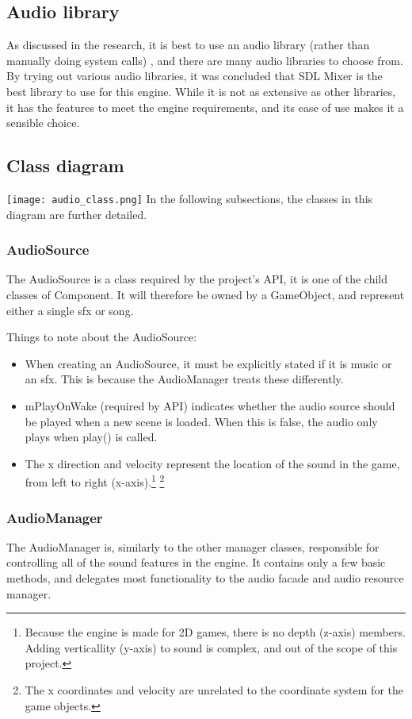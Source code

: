 \documentclass{article}
\begin{document}
\subsection{Audio library}
As discussed in the research, it is best to use an audio library (rather than manually doing system calls)
, and there are many audio libraries to choose from. By trying out various audio libraries, it was concluded that
SDL Mixer is the best library to use for this engine. While it is not as extensive as other libraries,
it has the features to meet the engine requirements, and its ease of use makes it a sensible choice.

\subsection{Class diagram}
\texttt{[image: audio\_class.png]}
In the following subsections, the classes in this diagram are further detailed.
\subsubsection{AudioSource}
The AudioSource is a class required by the project's API, it is one of the child classes of Component.
It will therefore be owned by a GameObject, and represent either a single sfx or song.

Things to note about the AudioSource:
\begin{itemize}
  \item When creating an AudioSource, it must be explicitly stated if it is music or an sfx. This is because the AudioManager treats these differently.
  \item mPlayOnWake (required by API) indicates whether the audio source should be played when a new scene is loaded. When this is false, the audio only plays when play() is called.
  \item The x direction and velocity represent the location of the sound in the game, from left to right (x-axis).\footnote{Because the engine is made for 2D games, there is no depth (z-axis) members. Adding verticallity (y-axis) to sound is complex, and out of the scope of this project.} \footnote{The x coordinates and velocity are unrelated to the coordinate system for the game objects.}
\end{itemize}

\subsubsection{AudioManager}
The AudioManager is, similarly to the other manager classes, responsible for controlling all of the sound features in the engine.
It contains only a few basic methods, and delegates most functionality to the audio facade and audio resource manager.
\end{document}
